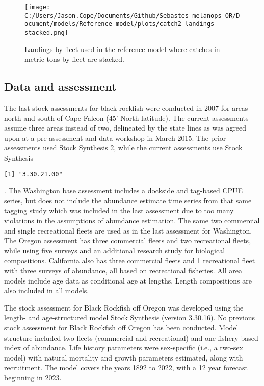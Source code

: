 \documentclass[11pt,
  english,
  letterpaper,
]{article}
\begin{document}


\begin{figure}
\centering
\texttt{[image: C:/Users/Jason.Cope/Documents/Github/Sebastes\_melanops\_OR/Document/models/Reference model/plots/catch2 landings stacked.png]}
\caption{Landings by fleet used in the reference model where catches in metric tons by fleet are stacked.\label{fig:es-catch}}
\end{figure}

\clearpage

\hypertarget{data-and-assessment}{%
\subsection*{Data and assessment}\label{data-and-assessment}}

The last stock assessments for black rockfish were conducted in 2007 for areas north and south of Cape Falcon (45' North latitude). The current assessments assume three areas instead of two, delineated by the state lines as was agreed upon at a pre-assessment and data workshop in March 2015. The prior assessments used Stock Synthesis 2, while the current assessments use Stock Synthesis

\begin{verbatim}
[1] "3.30.21.00"
\end{verbatim}

. The Washington base assessment includes a dockside and tag-based CPUE series, but does not include the abundance estimate time series from that same tagging study which was included in the last assessment due to too many violations in the assumptions of abundance estimation. The same two commercial and single recreational fleets are used as in the last assessment for Washington. The Oregon assessment has three commercial fleets and two recreational fleets, while using five surveys and an additional research study for biological compositions. California also has three commercial fleets and 1 recreational fleet with three surveys of abundance, all based on recreational fisheries. All area models include age data as conditional age at lengths. Length compositions are also included in all models.

The stock assessment for Black Rockfish off Oregon was developed using the length- and age-structured model Stock Synthesis (version 3.30.16). No previous stock assessment for Black Rockfish off Oregon has been conducted. Model structure included two fleets (commercial and recreational) and one fishery-based index of abundance. Life history parameters were sex-specific (i.e., a two-sex model) with natural mortality and growth parameters estimated, along with recruitment. The model covers the years 1892 to 2022, with a 12 year forecast beginning in 2023.
\end{document}

